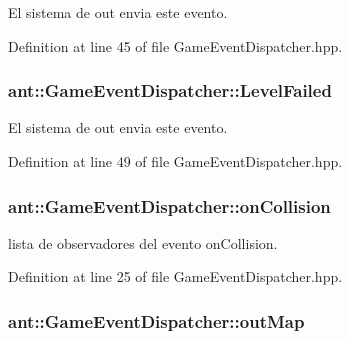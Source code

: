 El sistema de out envia este evento. 



Definition at line 45 of file Game\+Event\+Dispatcher.\+hpp.

\hypertarget{classant_1_1_game_event_dispatcher_a0a9bbdc52262860271909d1461e7b451}{
\subsubsection[{Level\+Failed}]{ ant\+::\+Game\+Event\+Dispatcher\+::\+Level\+Failed}}\label{classant_1_1_game_event_dispatcher_a0a9bbdc52262860271909d1461e7b451}


El sistema de out envia este evento. 



Definition at line 49 of file Game\+Event\+Dispatcher.\+hpp.

\hypertarget{classant_1_1_game_event_dispatcher_a610093857ac94ea9c91d8896928424c4}{
\subsubsection[{on\+Collision}]{ ant\+::\+Game\+Event\+Dispatcher\+::on\+Collision}}\label{classant_1_1_game_event_dispatcher_a610093857ac94ea9c91d8896928424c4}


lista de observadores del evento on\+Collision. 



Definition at line 25 of file Game\+Event\+Dispatcher.\+hpp.

\hypertarget{classant_1_1_game_event_dispatcher_a109269d2769c69e6ffdd83ac777c8e56}{
\subsubsection[{out\+Map}]{ ant\+::\+Game\+Event\+Dispatcher\+::out\+Map}}\label{classant_1_1_game_event_dispatcher_a109269d2769c69e6ffdd83ac777c8e56}


